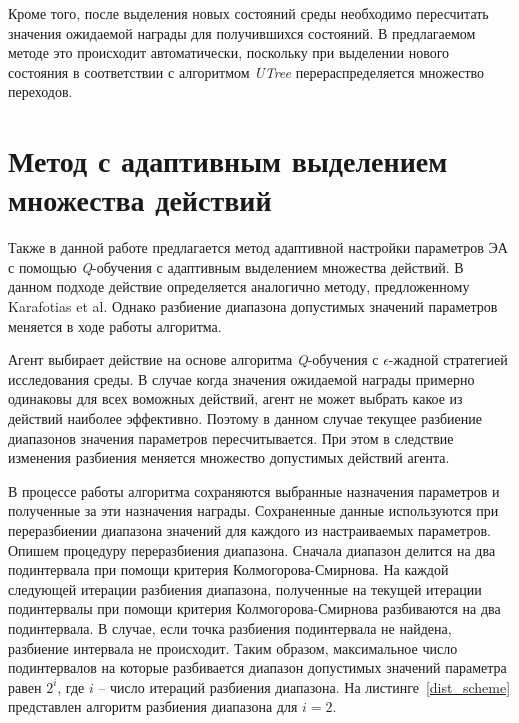 Кроме того, после выделения новых состояний среды необходимо пересчитать значения ожидаемой награды для получившихся состояний. В предлагаемом методе это происходит автоматически, поскольку при выделении нового состояния в соответствии с алгоритмом \textit{UTree} перераспределяется множество переходов.

\section{Метод с адаптивным выделением множества действий}
\label{dist_method}

Также в данной работе предлагается метод адаптивной настройки параметров ЭА с помощью \textit{Q}-обучения с адаптивным выделением множества действий. В данном подходе действие определяется аналогично методу, предложенному  Karafotias et al. Однако разбиение диапазона допустимых значений параметров меняется в ходе работы алгоритма.

Агент выбирает действие на основе алгоритма \textit{Q}-обучения с $\epsilon$-жадной стратегией исследования среды. В случае когда значения ожидаемой награды примерно одинаковы для всех воможных действий, агент не может выбрать какое из действий наиболее эффективно. Поэтому в данном случае текущее разбиение диапазонов значения параметров пересчитывается. При этом в следствие изменения разбиения меняется множество допустимых действий агента.

В процессе работы алгоритма сохраняются выбранные назначения параметров и полученные за эти назначения награды.  Сохраненные данные используются при переразбиении диапазона значений для каждого из настраиваемых параметров. Опишем процедуру переразбиения диапазона. Сначала диапазон делится на два подинтервала при помощи критерия Колмогорова-Смирнова. На каждой следующей итерации разбиения диапазона, полученные на текущей итерации подинтервалы при помощи критерия Колмогорова-Смирнова разбиваются на два подинтервала. В случае, если точка разбиения подинтервала не найдена, разбиение интервала не происходит. Таким образом, максимальное число подинтервалов на которые разбивается диапазон допустимых значений параметра равен $2^i$, где $i$ -- число итераций разбиения диапазона. На листинге~\ref{dist_scheme} представлен алгоритм разбиения диапазона для $i = 2$.


